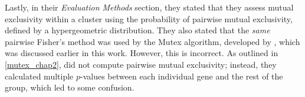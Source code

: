 Lastly, in their \textit{Evaluation Methods} section, they stated that they assess mutual exclusivity within a cluster using the probability of pairwise mutual exclusivity, defined by a hypergeometric distribution. They also stated that the \textit{same} pairwise Fisher’s method was used by the Mutex algorithm, developed by \textcite{mutex}, which was discussed earlier in this work. However, this is incorrect. As outlined in \cref{mutex_chap2}, \textcite{mutex} did not compute pairwise mutual exclusivity; instead, they calculated multiple $p$-values between each individual gene and the rest of the group, which led to some confusion.

\cleardoublepage
